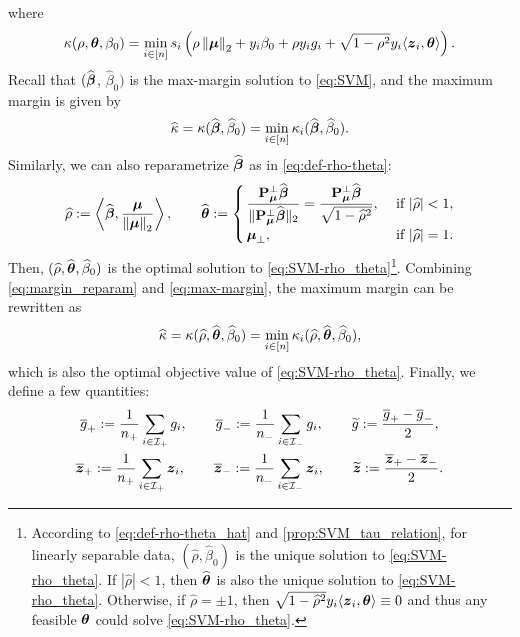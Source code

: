 where
\begin{equation*}
    \kappa(\rho, {\boldsymbol{\theta}}, \beta_0) = 
    \min\limits_{i \in [n]} s_i \left( \rho \left\|{{\boldsymbol{\mu}}}\right\|_2 + y_i\beta_0 + \rho y_i g_i + \sqrt{1 - \rho^2} y_i \langle \text{\boldmath $z$}_i, {\boldsymbol{\theta}} \rangle \right).
\end{equation*}
Recall that $(\widehat{{\boldsymbol{\beta}}}$, $\hat\beta_0)$ is the max-margin solution to \cref{eq:SVM}, and the maximum margin is given by
\begin{equation}\label{eq:max-margin}
    \widehat\kappa = \kappa(\widehat{{\boldsymbol{\beta}}}, \widehat\beta_0) = \min_{i \in [n]} \kappa_i(\widehat{{\boldsymbol{\beta}}}, \widehat\beta_0).
\end{equation}
Similarly, we can also reparametrize $\widehat{{\boldsymbol{\beta}}}$ as in \cref{eq:def-rho-theta}:
\begin{equation}\label{eq:def-rho-theta_hat}
    \widehat\rho := \left\langle \widehat{{\boldsymbol{\beta}}}, \frac{{\boldsymbol{\mu}}}{\left\|{{\boldsymbol{\mu}}}\right\|_2} \right\rangle,
    \qquad
    \widehat{{\boldsymbol{\theta}}} := 
    \begin{cases} 
        \, \dfrac{\mathrm{\bf P}_{{\boldsymbol{\mu}}}^\perp \widehat{{\boldsymbol{\beta}}}}{\|\mathrm{\bf P}_{{\boldsymbol{\mu}}}^\perp \widehat{{\boldsymbol{\beta}}}\|_2}
        = \dfrac{\mathrm{\bf P}_{{\boldsymbol{\mu}}}^\perp \widehat{{\boldsymbol{\beta}}}}{\sqrt{1 - \widehat\rho^2}} , & \ \text{if} \ |\widehat\rho| < 1, \\
        \, {\boldsymbol{\mu}}_\perp ,         & \ \text{if} \ |\widehat\rho| = 1.
    \end{cases}
\end{equation}
Then, $(\widehat\rho, \widehat{{\boldsymbol{\theta}}}, \widehat\beta_0)$ is the optimal solution to \cref{eq:SVM-rho_theta}\footnote{
    According to \cref{eq:def-rho-theta_hat} and \cref{prop:SVM_tau_relation}, for linearly separable data, $(\hat\rho, \hat\beta_0)$ is the unique solution to \cref{eq:SVM-rho_theta}. If $|\hat\rho| < 1$, then $\widehat{{\boldsymbol{\theta}}}$ is also the unique solution to \cref{eq:SVM-rho_theta}. Otherwise, if $\hat\rho = \pm 1$, then $\sqrt{1 - \widehat\rho^2} y_i \langle \text{\boldmath $z$}_i, {\boldsymbol{\theta}} \rangle \equiv 0$ and thus any feasible ${\boldsymbol{\theta}}$ could solve \cref{eq:SVM-rho_theta}.
}. Combining \cref{eq:margin_reparam} and \eqref{eq:max-margin}, the maximum margin can be rewritten as
\begin{equation}\label{eq:max-margin1}
    \widehat\kappa = \kappa(\widehat\rho, \widehat{{\boldsymbol{\theta}}}, \widehat\beta_0) = \min_{i \in [n]} \kappa_i(\widehat\rho, \widehat{{\boldsymbol{\theta}}}, \widehat\beta_0),
\end{equation}
which is also the optimal objective value of \cref{eq:SVM-rho_theta}. Finally, we define a few quantities:
\begin{gather*}
    \overline g_{+} :=  \frac{1}{n_+}\sum_{i \in \mathcal{I}_+} g_i, 
    \qquad
    \overline g_{-} :=  \frac{1}{n_-}\sum_{i \in \mathcal{I}_-} g_i, 
    \qquad
    \widetilde g := \frac{\overline g_{+} - \overline g_{-}}{2},
    \\
    \overline {\text{\boldmath $z$}}_{+} := \frac{1}{n_+}\sum_{i \in \mathcal{I}_+} \text{\boldmath $z$}_i,     
    \qquad
    \overline {\text{\boldmath $z$}}_{-} := \frac{1}{n_-}\sum_{i \in \mathcal{I}_-} \text{\boldmath $z$}_i,
    \qquad
    \widetilde{\text{\boldmath $z$}}  := \frac{\overline{\text{\boldmath $z$}}_{+} - \overline{\text{\boldmath $z$}}_{-}}{2}.
\end{gather*}
